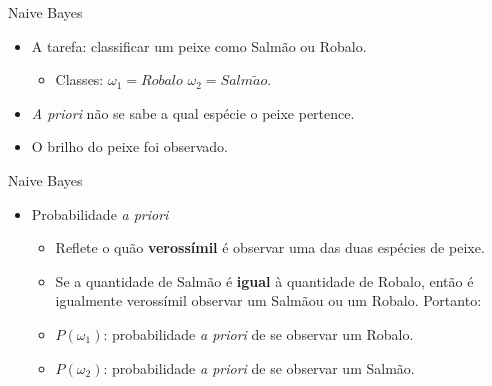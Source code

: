 \documentclass{libs/ufc_format}
\begin{document}
\begin{frame}{Naive Bayes}
    \begin{itemize}
        \justifying
        \item A tarefa: classificar um peixe como Salmão ou Robalo.
            \begin{itemize}
                \item Classes: $\omega_1 = Robalo$ \hspace{1cm} $\omega_2 = Salm\tilde{a}o$.
            \end{itemize}
        \item<2-> \textit{A priori} não se sabe a qual espécie o peixe pertence.
        \item<3-> O brilho do peixe foi observado.
    \end{itemize}
\end{frame}

\begin{frame}{Naive Bayes}
    \begin{itemize}
        \item Probabilidade \textit{a priori}
            \begin{itemize}
                \justifying
                \item Reflete o quão \textbf{verossímil} é observar uma das duas espécies de peixe.
                \item Se a quantidade de Salmão é \textbf{igual} à quantidade de Robalo, então é igualmente verossímil observar um Salmãou ou um Robalo. Portanto:
                \item<2-> $P(\omega_{1})$: probabilidade \textit{a priori} de se observar um Robalo.
                \item<3-> $P(\omega_{2})$: probabilidade \textit{a priori} de se observar um Salmão.
            \end{itemize}
    \end{itemize}
\end{frame}
\end{document}
